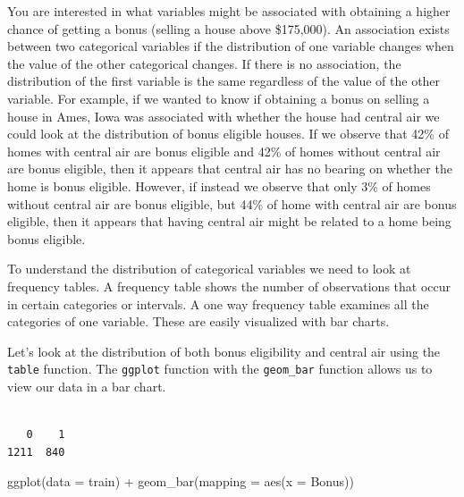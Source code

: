 \documentclass[
  letterpaper,
  DIV=11,
  numbers=noendperiod]{scrreprt}
\newenvironment{Shaded}{\begin{snugshade}}{\end{snugshade}}
\newcommand{\AttributeTok}[1]{\textcolor[rgb]{0.40,0.45,0.13}{#1}}
\newcommand{\FunctionTok}[1]{\textcolor[rgb]{0.28,0.35,0.67}{#1}}
\newcommand{\NormalTok}[1]{\textcolor[rgb]{0.00,0.23,0.31}{#1}}
\newcommand{\SpecialCharTok}[1]{\textcolor[rgb]{0.37,0.37,0.37}{#1}}
\begin{document}
You are interested in what variables might be associated with obtaining
a higher chance of getting a bonus (selling a house above \$175,000). An
association exists between two categorical variables if the distribution
of one variable changes when the value of the other categorical changes.
If there is no association, the distribution of the first variable is
the same regardless of the value of the other variable. For example, if
we wanted to know if obtaining a bonus on selling a house in Ames, Iowa
was associated with whether the house had central air we could look at
the distribution of bonus eligible houses. If we observe that 42\% of
homes with central air are bonus eligible and 42\% of homes without
central air are bonus eligible, then it appears that central air has no
bearing on whether the home is bonus eligible. However, if instead we
observe that only 3\% of homes without central air are bonus eligible,
but 44\% of home with central air are bonus eligible, then it appears
that having central air might be related to a home being bonus eligible.

To understand the distribution of categorical variables we need to look
at frequency tables. A frequency table shows the number of observations
that occur in certain categories or intervals. A one way frequency table
examines all the categories of one variable. These are easily visualized
with bar charts.

Let's look at the distribution of both bonus eligibility and central air
using the \texttt{table} function. The \texttt{ggplot} function with the
\texttt{geom\_bar} function allows us to view our data in a bar chart.

\begin{Shaded}
\end{Shaded}

\begin{verbatim}

   0    1 
1211  840 
\end{verbatim}

\begin{Shaded}
\begin{Highlighting}[]
\FunctionTok{ggplot}\NormalTok{(}\AttributeTok{data =}\NormalTok{ train) }\SpecialCharTok{+}
  \FunctionTok{geom\_bar}\NormalTok{(}\AttributeTok{mapping =} \FunctionTok{aes}\NormalTok{(}\AttributeTok{x =}\NormalTok{ Bonus))}
\end{Highlighting}
\end{Shaded}
\end{document}
